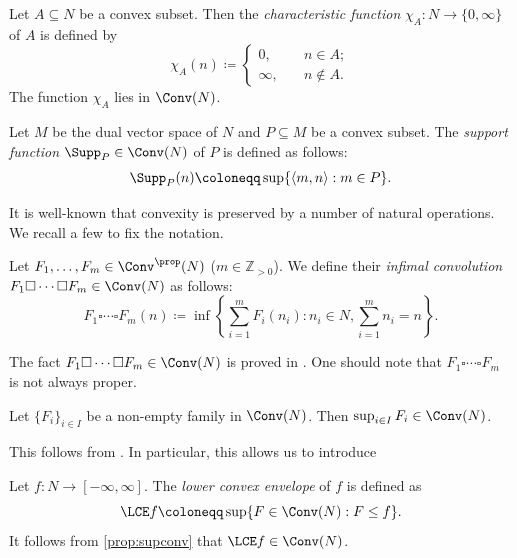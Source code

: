 \begin{example}\label{ex:charconvex}
    Let $A\subseteq N$ be a convex subset. Then the \emph{characteristic function} $\chi_A\colon N\rightarrow \{0,\infty\}$ of $A$ is defined by
    \[
    \chi_A(n)\coloneqq
    \left\{
    \begin{aligned}
        0,&\quad n\in A;\\
        \infty,&\quad n\not\in A.
    \end{aligned}
    \right.
    \]
    The function $\chi_A$ lies in $\Conv(N)$.
\end{example}

\begin{example}\label{ex:suppfun}
    Let $M$ be the dual vector space of $N$ and $P\subseteq M$ be a convex subset. The \emph{support function} $\Supp_P\in \Conv(N)$ of $P$ is defined as follows:
    \[
        \Supp_P(n)\coloneqq \sup\{ \langle m,n \rangle: m\in P \}.
    \]
\end{example}

It is well-known that convexity is preserved by a number of natural operations. We recall a few to fix the notation.

\begin{definition}\label{def:convex:L60}
    Let $F_1,\ldots,F_m\in \Conv^{\prop}(N)$ ($m\in \mathbb{Z}_{>0}$). We define their \emph{infimal convolution} $F_1 \square \cdots \square F_m\in \Conv(N)$ as follows:
    \[
    F_1 \square \cdots \square F_m(n)\coloneqq \inf\left\{ \sum_{i=1}^m F_i(n_i):n_i\in N, \sum_{i=1}^m n_i=n \right\}.
    \]
\end{definition}
The fact $F_1 \square \cdots \square F_m\in \Conv(N)$ is proved in \cite[Theorem~5.4]{Roc70}. One should note that $F_1 \square \cdots \square F_m$ is not always proper.

\begin{proposition}\label{prop:supconv}
    Let $\{F_i\}_{i\in I}$ be a non-empty family in $\Conv(N)$. Then $\sup_{i\in I} F_i\in \Conv(N)$.
\end{proposition}
This follows from \cite[Theorem~5.5]{Roc70}. In particular, this allows us to introduce
\begin{definition}\label{def:LCE}
    Let $f\colon N\rightarrow [-\infty,\infty]$. The \emph{lower convex envelope}\index{$\LCE$} of $f$ is defined as
    \[
    \LCE f\coloneqq \sup\{F\in \Conv(N): F\leq f \}.
    \]
    It follows from \cref{prop:supconv} that $\LCE f\in \Conv(N)$.
\end{definition}



